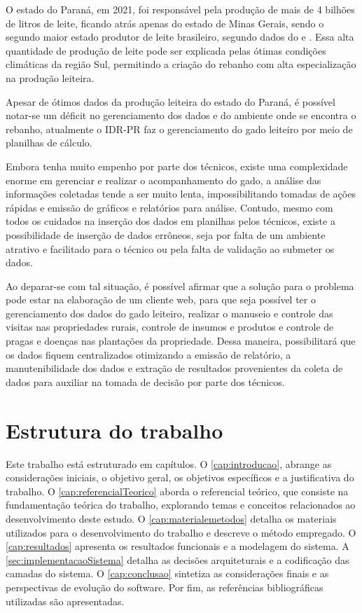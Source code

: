 O estado do Paraná, em 2021, foi responsável pela produção de mais de 4 bilhões de litros de leite, ficando atrás apenas do estado de Minas Gerais, sendo o segundo maior estado produtor de leite brasileiro, segundo dados do  e . Essa alta quantidade de produção de leite pode ser explicada pelas ótimas condições climáticas da região Sul, permitindo a criação do rebanho com alta especialização na produção leiteira.

Apesar de ótimos dados da produção leiteira do estado do Paraná, é possível notar-se um déficit no gerenciamento dos dados e do ambiente onde se encontra o rebanho, atualmente o \gls{IDR-PR} faz o gerenciamento do gado leiteiro por meio de planilhas de cálculo.

Embora tenha muito empenho por parte dos técnicos, existe uma complexidade enorme em gerenciar e realizar o acompanhamento do gado, a análise das informações coletadas tende a ser muito lenta, impossibilitando tomadas de ações rápidas e emissão de gráficos e relatórios para análise. Contudo, mesmo com todos os cuidados na inserção dos dados em planilhas pelos técnicos, existe a possibilidade de inserção de dados errôneos, seja por falta de um ambiente atrativo e facilitado para o técnico ou pela falta de validação ao submeter os dados.

Ao deparar-se com tal situação, é possível afirmar que a solução para o problema pode estar na elaboração de um cliente web, para que seja possível ter o gerenciamento dos dados do gado leiteiro, realizar o manuseio e controle das visitas nas propriedades rurais, controle de insumos e produtos e controle de pragas e doenças nas plantações da propriedade. Dessa maneira, possibilitará que os dados fiquem centralizados otimizando a emissão de relatório, a manutenibilidade dos dados e extração de resultados provenientes da coleta de dados para auxiliar na tomada de decisão por parte dos técnicos.

\section{Estrutura do trabalho}\label{sec:estruturaTrabalho}

Este trabalho está estruturado em capítulos. O \autoref{cap:introducao}, abrange as considerações iniciais, o objetivo geral, os objetivos específicos e a justificativa do trabalho. O \autoref{cap:referencialTeorico} aborda o referencial teórico, que consiste na fundamentação teórica do trabalho, explorando temas e conceitos relacionados ao desenvolvimento deste estudo. O \autoref{cap:materialemetodos} detalha os materiais utilizados para o desenvolvimento do trabalho e descreve o método empregado. O \autoref{cap:resultados} apresenta os resultados funcionais e a modelagem do sistema. A \autoref{sec:implementacaoSistema} detalha as decisões arquiteturais e a codificação das camadas do sistema. O \autoref{cap:conclusao} sintetiza as considerações finais e as perspectivas de evolução do software. Por fim, as referências bibliográficas utilizadas são apresentadas.
